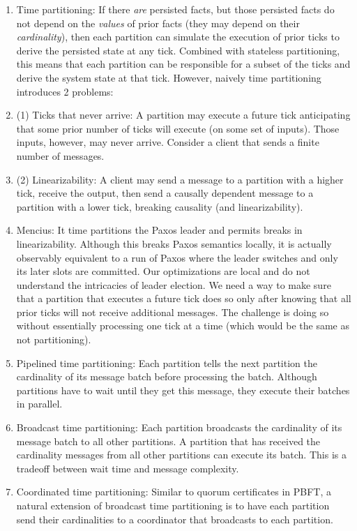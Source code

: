 \begin{enumerate}
\begin{enumerate}
      \item Time partitioning: If there \emph{are} persisted facts, but those persisted facts do not depend on the \emph{values} of prior facts (they may depend on their \emph{cardinality}), then each partition can simulate the execution of prior ticks to derive the persisted state at any tick.
        Combined with stateless partitioning, this means that each partition can be responsible for a subset of the ticks and derive the system state at that tick.
        However, naively time partitioning introduces 2 problems:
      \item (1) Ticks that never arrive: A partition may execute a future tick anticipating that some prior number of ticks will execute (on some set of inputs).
        Those inputs, however, may never arrive.
        Consider a client that sends a finite number of messages.
      \item (2) Linearizability: A client may send a message to a partition with a higher tick, receive the output, then send a causally dependent message to a partition with a lower tick, breaking causality (and linearizability).
      \item Mencius: It time partitions the Paxos leader and permits breaks in linearizability.
        Although this breaks Paxos semantics locally, it is actually observably equivalent to a run of Paxos where the leader switches and only its later slots are committed.
        Our optimizations are local and do not understand the intricacies of leader election.
        We need a way to make sure that a partition that executes a future tick does so only after knowing that all prior ticks will not receive additional messages.
        The challenge is doing so without essentially processing one tick at a time (which would be the same as not partitioning).
      \item Pipelined time partitioning: Each partition tells the next partition the cardinality of its message batch before processing the batch.
        Although partitions have to wait until they get this message, they execute their batches in parallel.
      \item Broadcast time partitioning: Each partition broadcasts the cardinality of its message batch to all other partitions.
        A partition that has received the cardinality messages from all other partitions can execute its batch.
        This is a tradeoff between wait time and message complexity.
      \item Coordinated time partitioning: Similar to quorum certificates in PBFT, a natural extension of broadcast time partitioning is to have each partition send their cardinalities to a coordinator that broadcasts to each partition.

\end{enumerate}
\end{enumerate}
